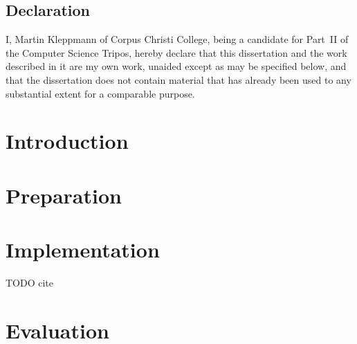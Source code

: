 \documentclass[twoside,notitlepage]{report}
\begin{document}
\section*{Declaration}

I, Martin Kleppmann of Corpus Christi College, being a candidate for Part~II of the Computer
Science Tripos, hereby declare that this dissertation and the work described in it are my own
work, unaided except as may be specified below, and that the dissertation does not contain
material that has already been used to any substantial extent for a comparable purpose.

\vspace{20mm}
\vspace{12mm}
\cleardoublepage

\tableofcontents
\chapter{Introduction}

\chapter{Preparation}




\chapter{Implementation}



TODO cite \cite{Mirtich:96,Moeller:97}

\chapter{Evaluation}
\end{document}

